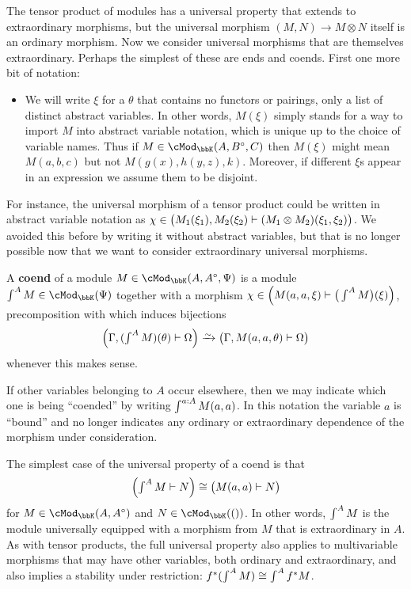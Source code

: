 \documentclass{amsart}
\newcommand{\K}{\bbK}
\let\mod\cMod
\def\modk{\mod_\K}
\renewcommand{\o}{^{\circ}}
\let\mto\vdash    %
\def\mhom#1#2{\left( #1 \vphantom{\big|}\mto #2 \right)}
\newcommand{\coend}{\begingroup\textstyle\int\endgroup}
\begin{document}
The tensor product of modules has a universal property that extends to extraordinary morphisms, but the universal morphism $(M,N)\to M\otimes N$ itself is an ordinary morphism.
Now we consider universal morphisms that are themselves extraordinary.
Perhaps the simplest of these are ends and coends.
First one more bit of notation:

\begin{itemize}
\item We will write $\xi$ for a $\theta$ that contains no functors or pairings, only a list of distinct abstract variables.
  In other words, $M(\xi)$ simply stands for a way to import $M$ into abstract variable notation, which is unique up to the choice of variable names.
  Thus if $M\in \modk(A,B\o,C)$ then $M(\xi)$ might mean $M(a,b,c)$ but not $M(g(x),h(y,z),k)$.
  Moreover, if different $\xi$s appear in an expression we assume them to be disjoint.
\end{itemize}

For instance, the universal morphism of a tensor product could be written in abstract variable notation as $\chi \in \mhom{M_1(\xi_1), M_2(\xi_2)}{(M_1\otimes M_2)(\xi_1,\xi_2)}$.
We avoided this before by writing it without abstract variables, but that is no longer possible now that we want to consider extraordinary universal morphisms.

\begin{defn}
  A \textbf{coend} of a module $M\in \modk(A,A\o,\Psi)$ is a module $\coend^A M\in\modk(\Psi)$ together with a morphism $\chi\in\mhom{M(a,a,\xi)}{\big(\coend^A M\big)(\xi)}$, precomposition with which induces bijections
  \[ \mhom{\Gamma,(\coend^A M)(\theta)}{\Omega} \toiso \mhom{\Gamma,M(a,a,\theta)}{\Omega} \]
  whenever this makes sense.
\end{defn}

If other variables belonging to $A$ occur elsewhere, then we may indicate which one is being ``coended'' by writing $\coend^{a:A} M(a,a)$.
In this notation the variable $a$ is ``bound'' and no longer indicates any ordinary or extraordinary dependence of the morphism under consideration.

The simplest case of the universal property of a coend is that
\[ \mhom{\coend^A M}{N} \cong \mhom{M(a,a)}{N} \]
for $M\in\modk(A,A\o)$ and $N\in\modk(())$.
In other words, $\coend^A M$ is the module universally equipped with a morphism from $M$ that is extraordinary in $A$.
As with tensor products, the full universal property also applies to multivariable morphisms that may have other variables, both ordinary and extraordinary, and also implies a stability under restriction: $f^*(\coend^A M) \cong \coend^A f^*M$.
\end{document}
